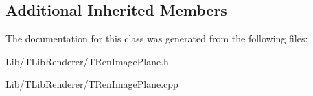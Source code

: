 \subsection*{Additional Inherited Members}


The documentation for this class was generated from the following files\+:\begin{DoxyCompactItemize}
\item 
Lib/\+T\+Lib\+Renderer/T\+Ren\+Image\+Plane.\+h\item 
Lib/\+T\+Lib\+Renderer/T\+Ren\+Image\+Plane.\+cpp\end{DoxyCompactItemize}
